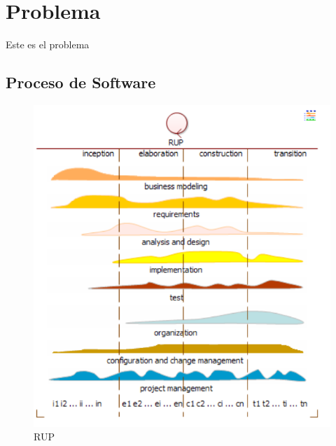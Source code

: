 \chapter{Problema}
Este es el problema \cite{Bol_2012,Bol_2016}

\section{Proceso de Software}

\begin{figure}[th!]
	\centering
	\includegraphics[width=0.7\linewidth]{proyecto/imgs/rup}
	\caption{RUP}
	\label{fig:rup}
\end{figure}

